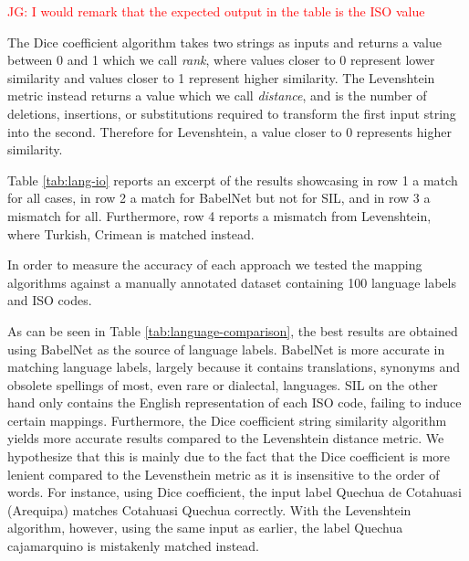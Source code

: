 \documentclass[11pt]{article}
\begin{document}
\textcolor{red}{JG: I would remark that the expected output in the table is the ISO value}

The Dice coefficient algorithm takes two strings as inputs and returns a value between 0 and 1 which we call \textit{rank}, where values closer to 0 represent lower similarity and values closer to 1 represent higher similarity. The Levenshtein metric instead returns a value which we call \textit{distance}, and is the number of deletions, insertions, or substitutions required to transform the first input string into the second. Therefore for Levenshtein, a value closer to 0 represents higher similarity. 

Table \ref{tab:lang-io} reports an excerpt of the results showcasing in row 1 a match for all cases, in row 2 a match for BabelNet but not for SIL, and in row 3 a mismatch for all. Furthermore, row 4 reports a mismatch from Levenshtein, where \textsf{Turkish, Crimean} is matched instead.


In order to measure the accuracy of each approach we tested the mapping algorithms against a manually annotated dataset containing 100 language labels and ISO codes.

As can be seen in Table \ref{tab:language-comparison}, the best results are obtained using BabelNet as the source of language labels. BabelNet is more accurate in matching language labels, largely because it contains translations, synonyms and obsolete spellings of most, even rare or dialectal, languages. SIL on the other hand only contains the English representation of each ISO code, failing to induce certain mappings. Furthermore, the Dice coefficient string similarity algorithm yields more accurate results compared to the Levenshtein distance metric. We hypothesize that this is mainly due to the fact that the Dice coefficient is more lenient compared to the Levensthein metric as it is insensitive to the order of words. For instance, using Dice coefficient, the input label \textsf{Quechua de Cotahuasi (Arequipa)} matches \textsf{Cotahuasi Quechua} correctly. With the Levenshtein algorithm, however, using the same input as earlier, the label \textsf{Quechua cajamarquino} is mistakenly matched instead.
\end{document}
